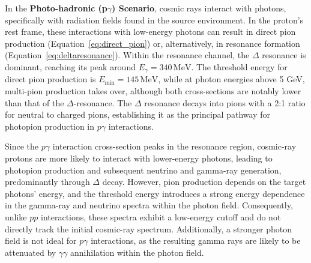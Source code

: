 In the \textbf{Photo-hadronic (p$\gamma$) Scenario}, cosmic rays interact with photons, specifically with radiation fields found in the source environment. In the proton’s rest frame, these interactions with low-energy photons can result in direct pion production (Equation~\ref{eq:direct_pion}) or, alternatively, in resonance formation (Equation~\ref{eq:deltaresonance}). Within the resonance channel, the $\Delta$ resonance is dominant, reaching its peak around $E_\gamma = 340 \, \text{MeV}$. The threshold energy for direct pion production is $E_{\text{min}} = 145 \, \text{MeV}$, while at photon energies above 5 GeV, multi-pion production takes over, although both cross-sections are notably lower than that of the $\Delta$-resonance. The $\Delta$ resonance decays into pions with a 2:1 ratio for neutral to charged pions, establishing it as the principal pathway for photopion production in $p\gamma$ interactions. 

Since the $p\gamma$ interaction cross-section peaks in the resonance region, cosmic-ray protons are more 
likely to interact with lower-energy photons, leading to photopion production and subsequent neutrino and gamma-ray generation, predominantly through $\Delta$ decay. However, pion production depends on the target photons’ energy, and the threshold energy introduces a strong energy dependence in the gamma-ray and neutrino spectra within the photon field. Consequently, unlike $pp$ interactions, these spectra exhibit a low-energy cutoff and do not directly track the initial cosmic-ray spectrum. Additionally, a stronger photon field is not ideal for $p\gamma$ interactions, as the resulting gamma rays are likely to be attenuated by $\gamma\gamma$ annihilation within the photon field.

